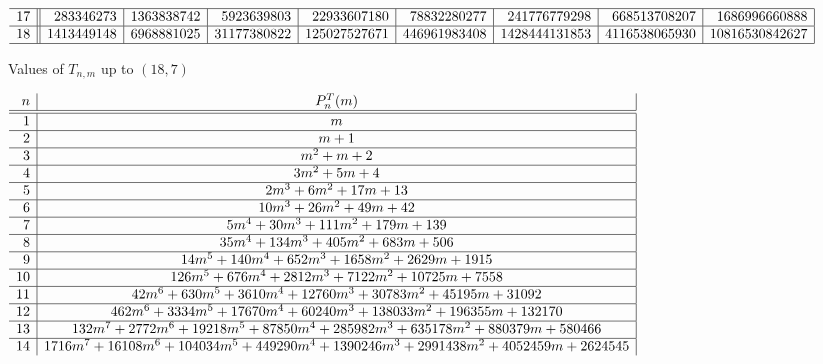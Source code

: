 \documentclass[preprint,authoryear]{elsarticle}
\begin{document}
\begin{landscape}
\begin{figure}[tb]
\begin{center}
\begin{math}
\begin{array}[h]{r || r | r | r | r | r | r| r| r| r}
          \hline
          17  & 283346273& 1363838742& 5923639803& 22933607180& 78832280277&
          241776779298& 668513708207& 1686996660888\\
          \hline
          18 & 1413449148& 6968881025& 31177380822& 125027527671& 
          446961983408&1428444131853&4116538065930& 10816530842627\\
          \hline
        \end{array}
      \end{math}
      \caption{Values of $T_{n,m}$ up to $(18,7)$}\label{fig:T}
    \end{center} 
\end{figure}
\end{landscape}

\begin{landscape}
  \begin{figure}[h]
    \centering
   \begin{math}
    \begin{array}[h]{ r | c | }
      n & P^T_n(m)\\
      \hline\hline
      1 & m \\
      \hline
      2 & m +1 \\
      \hline
      3 & m ^2 + m +2 \\
      \hline
      4 &3 m^{2}+5 m+4  \\
      \hline
      5 & 2m^3 + 6 m^2 + 17m +13\\
      \hline
      6 & 10m^3+ 26 m^2 + 49 m + 42\\
      \hline
      7 & 5 m^4 + 30 m^3 + 111 m^2 + 179m +139\\
      \hline
      8  & 35  m^4 + 134 m^3 + 405 m^2 + 683 m + 506\\
      \hline
      9 & 14 m^{5}+140 m^{4}+652 m^{3}+1658 m^{2}+2629 m+1915\\
      \hline
      10 & 126 m^{5}+676 m^{4}+2812 m^{3}+7122 m^{2}+10725 m+7558\\
      \hline
      11& 42 m^{6}+630 m^{5}+3610 m^{4}+12760 m^{3}+30783 m^{2}+45195 m+31092\\
      \hline
      12 & 462 m^{6}+3334 m^{5}+17670 m^{4}+60240 m^{3}+138033 m^{2}+196355 m+132170\\
      \hline
      13 & 132 m^{7}+2772 m^{6}+19218 m^{5}+87850 m^{4}+285982 m^{3}+635178 m^{2}+880379 m+580466\\
      \hline
      14 & 1716 m^{7}+16108 m^{6}+104034 m^{5}+449290 m^{4}+1390246 m^{3}+2991438 m^ {2}+4052459
      m+2624545\\

\end{array}
\end{math}
\end{figure}
\end{landscape}
\end{document}

